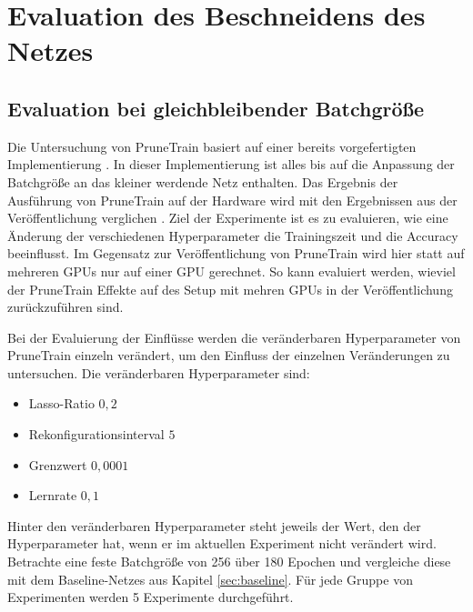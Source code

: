 
\chapter{Evaluation des Beschneidens des Netzes}\label{sec:ptexperimente}
\section{Evaluation bei gleichbleibender Batchgröße}

Die Untersuchung von PruneTrain basiert auf einer bereits vorgefertigten Implementierung \cite{ptImpl}. In dieser Implementierung ist alles bis auf die Anpassung der Batchgröße an das kleiner werdende Netz enthalten. Das Ergebnis der Ausführung von PruneTrain auf der Hardware wird mit den Ergebnissen aus der Veröffentlichung verglichen \cite{prunetrain}. Ziel der Experimente ist es zu evaluieren, wie eine Änderung der verschiedenen Hyperparameter die Trainingszeit und die Accuracy beeinflusst. Im Gegensatz zur Veröffentlichung von PruneTrain wird hier statt auf mehreren GPUs nur auf einer GPU gerechnet. So kann evaluiert werden, wieviel der PruneTrain Effekte auf des Setup mit mehren GPUs in der Veröffentlichung zurückzuführen sind. 

Bei der Evaluierung der Einflüsse werden die veränderbaren Hyperparameter von PruneTrain einzeln verändert, um den Einfluss der einzelnen Veränderungen zu untersuchen.  
Die veränderbaren Hyperparameter sind:
\begin{itemize}
 \item Lasso-Ratio $0,2$
 \item Rekonfigurationsinterval $5$
 \item Grenzwert $0,0001$
 \item Lernrate $0,1$
\end{itemize}
Hinter den veränderbaren Hyperparameter steht jeweils der Wert, den der Hyperparameter hat, wenn er im aktuellen Experiment nicht verändert wird.
Betrachte eine feste Batchgröße von 256 über 180 Epochen und vergleiche diese mit dem Baseline-Netzes aus Kapitel \ref{sec:baseline}. Für jede Gruppe von Experimenten werden 5 Experimente durchgeführt. 


